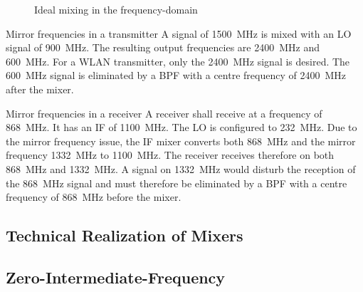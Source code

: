 \begin{refsection}
\begin{figure}[H]
{
	}
	
	\caption{Ideal mixing in the frequency-domain}
	\label{fig:ch05:ideal_mixing_freqdomain}
\end{figure}

\begin{example}{Mirror frequencies in a transmitter}
	A signal of \SI{1500}{MHz} is mixed with an \ac{LO} signal of \SI{900}{MHz}. The resulting output frequencies are \SI{2400}{MHz} and \SI{600}{MHz}. For a \ac{WLAN} transmitter, only the \SI{2400}{MHz} signal is desired. The \SI{600}{MHz} signal is eliminated by a \ac{BPF} with a centre frequency of \SI{2400}{MHz} after the mixer.
\end{example}

\begin{example}{Mirror frequencies in a receiver}
	A receiver shall receive at a frequency of \SI{868}{MHz}. It has an \ac{IF} of \SI{1100}{MHz}. The \ac{LO} is configured to \SI{232}{MHz}. Due to the mirror frequency issue, the \ac{IF} mixer converts both \SI{868}{MHz} and the mirror frequency \SI{1332}{MHz} to \SI{1100}{MHz}. The receiver receives therefore on both \SI{868}{MHz} and \SI{1332}{MHz}. A signal on \SI{1332}{MHz} would disturb the reception of the \SI{868}{MHz} signal and must therefore be eliminated by a \ac{BPF} with a centre frequency of \SI{868}{MHz} before the mixer.
\end{example}


\subsection{Technical Realization of Mixers}



\subsection{Zero-Intermediate-Frequency}


\end{refsection}
